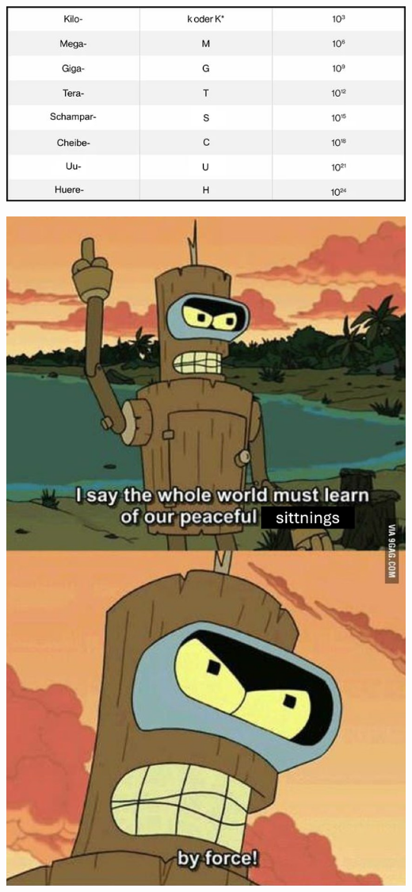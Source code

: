 \documentclass{article}
\begin{document}

\includegraphics[width=0.9\linewidth]{images/memes/huere.jpg}

\newpage
\begin{center}
\vspace*{15em}
\includegraphics[width=\linewidth]{images/memes/bender.jpg}
\end{center}
\vfill
\license
\end{document}

